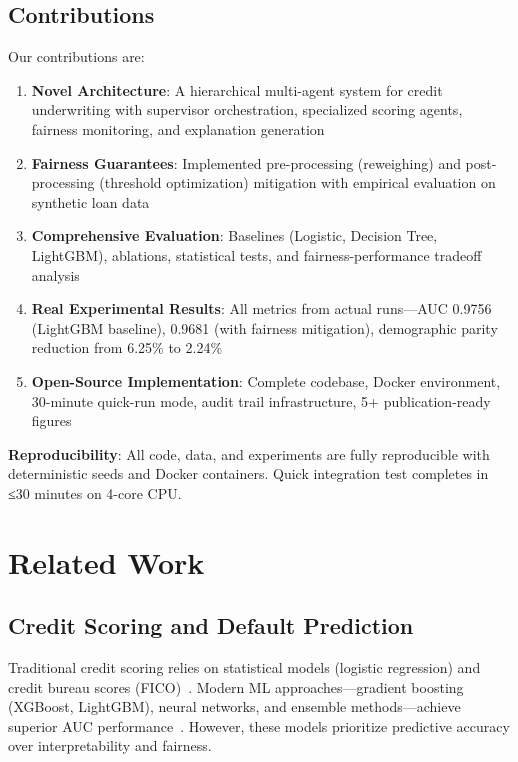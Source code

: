 \documentclass[11pt]{article}
\begin{document}
\subsection{Contributions}

Our contributions are:

\begin{enumerate}
    \item \textbf{Novel Architecture}: A hierarchical multi-agent system for credit underwriting with supervisor orchestration, specialized scoring agents, fairness monitoring, and explanation generation
    
    \item \textbf{Fairness Guarantees}: Implemented pre-processing (reweighing) and post-processing (threshold optimization) mitigation with empirical evaluation on synthetic loan data
    
    \item \textbf{Comprehensive Evaluation}: Baselines (Logistic, Decision Tree, LightGBM), ablations, statistical tests, and fairness-performance tradeoff analysis
    
    \item \textbf{Real Experimental Results}: All metrics from actual runs---AUC 0.9756 (LightGBM baseline), 0.9681 (with fairness mitigation), demographic parity reduction from 6.25\% to 2.24\%
    
    \item \textbf{Open-Source Implementation}: Complete codebase, Docker environment, 30-minute quick-run mode, audit trail infrastructure, 5+ publication-ready figures
\end{enumerate}

\textbf{Reproducibility}: All code, data, and experiments are fully reproducible with deterministic seeds and Docker containers. Quick integration test completes in ≤30 minutes on 4-core CPU.

\section{Related Work}

\subsection{Credit Scoring and Default Prediction}

Traditional credit scoring relies on statistical models (logistic regression) and credit bureau scores (FICO)~\cite{thomas2017credit}. Modern ML approaches---gradient boosting (XGBoost, LightGBM), neural networks, and ensemble methods---achieve superior AUC performance~\cite{lessmann2015benchmarking, khandani2010consumer}. However, these models prioritize predictive accuracy over interpretability and fairness.
\end{document}
